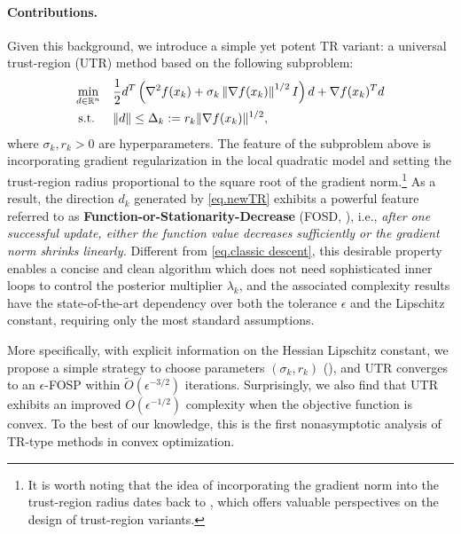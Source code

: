 \paragraph{Contributions.} Given this background, we introduce a simple yet potent TR variant: a universal trust-region (UTR) method based on the following subproblem:
\begin{equation}
    \begin{aligned}
        \min_{d \in \mathbb{R}^n} \quad &  \frac{1}{2}d^T\left (\nabla^2 f(x_k) + \sigma_k \left \|\nabla f(x_k)\right\|^{1/2} I \right ) d + \nabla f(x_k)^T d\\
        \text{s.t. } \quad & \|d\| \le \Delta_k := r_k \|\nabla f(x_k)\|^{1/2},
        \label{eq.newTR}
    \end{aligned}
\end{equation}
where $\sigma_k, r_k > 0$ are hyperparameters. The feature of the subproblem above is incorporating gradient regularization in the local quadratic model and setting the trust-region radius proportional to the square root of the gradient norm.\footnote{It is worth noting that the idea of incorporating the gradient norm into the trust-region radius dates back to \cite{fan2001new,yuan2015recent}, which offers valuable perspectives on the design of trust-region variants.} As a result, the direction $d_k$ generated by \eqref{eq.newTR} exhibits a powerful feature referred to as \textbf{Function-or-Stationarity-Decrease} (FOSD, ), i.e., \textit{after one successful update, either the function value decreases sufficiently or the gradient norm shrinks linearly.}  Different from \eqref{eq.classic descent}, this desirable property enables a concise and clean algorithm which does not need sophisticated inner loops to control the posterior multiplier $\lambda_k$, and the associated complexity results have the state-of-the-art dependency over both the tolerance $\epsilon$ and the Lipschitz constant, requiring only the most standard assumptions. 

More specifically, with explicit information on the Hessian Lipschitz constant, we propose a simple strategy to choose parameters $(\sigma_k, r_k)$ (), and UTR converges to an $\epsilon$-FOSP within $\tilde O(\epsilon^{-3/2})$ iterations. Surprisingly, we also find that UTR exhibits an improved $O(\epsilon^{-1/2})$ complexity when the objective function is convex. To the best of our knowledge, this is the first nonasymptotic analysis of TR-type methods in convex optimization.

